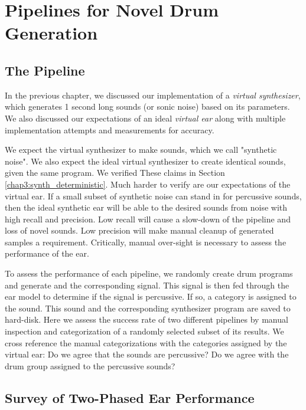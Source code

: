 \documentclass[\main/thesis.tex]{subfiles}
\begin{document}
\chapter{Pipelines for Novel Drum Generation}

\label{gens}
\section{The Pipeline}
 In the previous chapter, we discussed our implementation of a \emph{virtual synthesizer}, which generates 1 second long sounds (or sonic noise) based on its parameters. We also discussed our expectations of an ideal \emph{virtual ear} along with multiple implementation attempts and measurements for accuracy. 
 
 We expect the virtual synthesizer to make sounds, which we call "synthetic noise". We also expect the ideal virtual synthesizer to create identical sounds, given the same program. We verified These claims in Section \ref{chap3:synth_deterministic}. Much harder to verify are our expectations of the virtual ear. If a small subset of synthetic noise can stand in for percussive sounds, then the ideal synthetic ear will be able to the desired sounds from noise with high recall and precision. Low recall will cause a slow-down of the pipeline and loss of novel sounds. Low precision will make manual cleanup of generated samples a requirement. Critically, manual over-sight is necessary to assess the performance of the ear. 

To assess the performance of each pipeline, we randomly create drum programs and generate and the corresponding signal. This signal is then fed through the ear model to determine if the signal is percussive. If so, a category is assigned to the sound. This sound and the corresponding synthesizer program are saved to hard-disk. Here we assess the success rate of two different pipelines by manual inspection and categorization of a randomly selected subset of its results. We cross reference the manual categorizations with the categories assigned by the virtual ear: Do we agree that the sounds are percussive? Do we agree with the drum group assigned to the percussive sounds?
 
 \section{Survey of Two-Phased Ear Performance}
   
\end{document}
